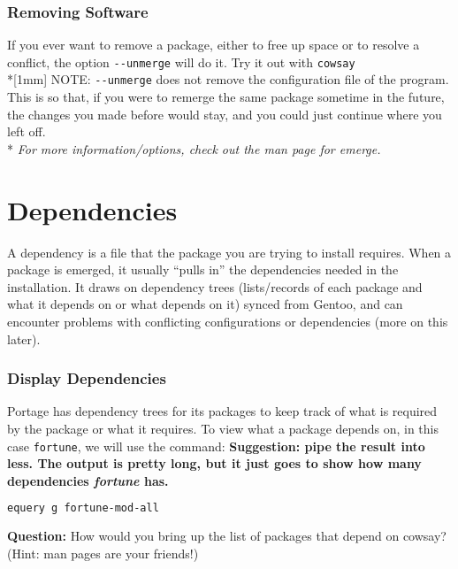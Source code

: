 \documentclass[11pt]{article}
\begin{document}
\subsubsection*{Removing Software}
    If you ever want to remove a package, either to free up space or to resolve a conflict, the option \verb|--unmerge| will do it. Try it out with \verb|cowsay|
   \\*[1mm] NOTE: \verb|--unmerge| does not remove the configuration file of the program. This is so that, if you were to remerge the same package sometime in the future, the changes you made before would stay, and you could just continue where you left off.
   \\* \textit{For more information/options, check out the \emph{man} page for \emph{emerge}.}



\section*{Dependencies}

    A dependency is a file that the package you are trying to install requires. When a package is emerged, it usually ``pulls in'' the dependencies needed in the installation. It draws on dependency trees (lists/records of each package and what it depends on or what depends on it) synced from Gentoo, and can encounter problems with conflicting configurations or dependencies (more on this later).

   \subsubsection*{Display Dependencies}
   Portage has dependency trees for its packages to keep track of what is required by the package or what it requires. To view what a package depends on, in this case \verb|fortune|, we will use the command: \textbf{Suggestion: pipe the result into less. The output is pretty long, but it just goes to show how many dependencies \emph{fortune} has.}
    \begin{lstlisting}[basicstyle=\ttfamily, backgroundcolor = \color{lightgray}, language = bash, xleftmargin = 0cm, framexleftmargin = 1em, framexrightmargin = 1em, showstringspaces=false]
equery g fortune-mod-all
\end{lstlisting}
    \textbf{Question:} How would you bring up the list of packages that depend on cowsay? (Hint: man pages are your friends!)
    
\end{document}

